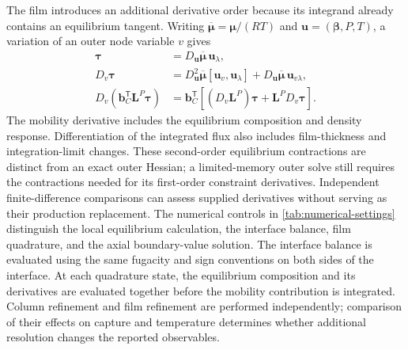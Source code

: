 The film introduces an additional derivative order because its integrand already contains an equilibrium tangent.
Writing $\overline{\boldsymbol\mu}=\boldsymbol\mu/(RT)$ and $\mathbf u=(\boldsymbol\beta,P,T)$, a variation of an outer node variable $v$ gives
\begin{align}
\boldsymbol\tau&=D_{\mathbf u}\overline{\boldsymbol\mu}\,\mathbf u_\lambda,\\
D_v\boldsymbol\tau
&=D_{\mathbf u}^2\overline{\boldsymbol\mu}[\mathbf u_v,\mathbf u_\lambda]
+D_{\mathbf u}\overline{\boldsymbol\mu}\,\mathbf u_{v\lambda},\\
D_v\!\left(\mathbf b_C^{\mathsf T}\mathbf L^P\boldsymbol\tau\right)
&=\mathbf b_C^{\mathsf T}\left[(D_v\mathbf L^P)\boldsymbol\tau+\mathbf L^P D_v\boldsymbol\tau\right].
\label{eq:film-composed-derivative}
\end{align}
The mobility derivative includes the equilibrium composition and density response.
Differentiation of the integrated flux also includes film-thickness and integration-limit changes.
These second-order equilibrium contractions are distinct from an exact outer Hessian; a limited-memory outer solve still requires the contractions needed for its first-order constraint derivatives.
Independent finite-difference comparisons can assess supplied derivatives without serving as their production replacement.
The numerical controls in \cref{tab:numerical-settings} distinguish the local equilibrium calculation, the interface balance, film quadrature, and the axial boundary-value solution.
The interface balance is evaluated using the same fugacity and sign conventions on both sides of the interface.
At each quadrature state, the equilibrium composition and its derivatives are evaluated together before the mobility contribution is integrated.
Column refinement and film refinement are performed independently; comparison of their effects on capture and temperature determines whether additional resolution changes the reported observables.


